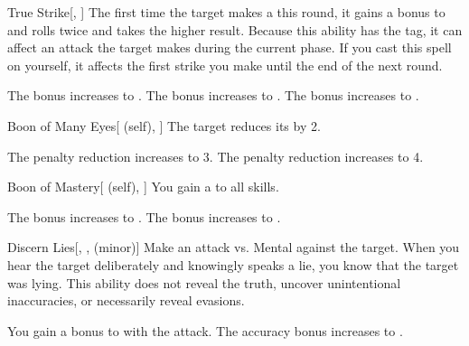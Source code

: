 \lowercase{\hypertarget{spell:True Strike}{}}\label{spell:True Strike}
\begin{freeability}[Rank 1]{\hypertarget{spell:True Strike}{True Strike}}[, ]
The first time the target makes a  this round,
it gains a  bonus to  and rolls twice and takes the higher result.
Because this ability has the  tag, it can affect an attack the target makes during the current phase.
If you cast this spell on yourself, it affects the first strike you make until the end of the next round.

\rankline
{} The bonus increases to .
 The bonus increases to .
 The bonus increases to .
\end{freeability}
\vspace{0.25em}



\lowercase{\hypertarget{spell:Boon of Many Eyes}{}}\label{spell:Boon of Many Eyes}
\begin{attuneability}[Rank 3]{\hypertarget{spell:Boon of Many Eyes}{Boon of Many Eyes}}[ (self), ]
The target reduces its  by 2.

\rankline
{} The penalty reduction increases to 3.
 The penalty reduction increases to 4.
\end{attuneability}
\vspace{0.25em}



\lowercase{\hypertarget{spell:Boon of Mastery}{}}\label{spell:Boon of Mastery}
\begin{attuneability}[Rank 3]{\hypertarget{spell:Boon of Mastery}{Boon of Mastery}}[ (self), ]
You gain a   to all skills.

\rankline
{} The bonus increases to .
 The bonus increases to .
\end{attuneability}
\vspace{0.25em}



\lowercase{\hypertarget{spell:Discern Lies}{}}\label{spell:Discern Lies}
\begin{freeability}[Rank 3]{\hypertarget{spell:Discern Lies}{Discern Lies}}[, ,  (minor)]
Make an attack vs. Mental against the target.
\hit When you hear the target deliberately and knowingly speaks a lie, you know that the target was lying.
This ability does not reveal the truth, uncover unintentional inaccuracies, or necessarily reveal evasions.

\rankline
{} You gain a  bonus to  with the attack.
 The accuracy bonus increases to .
\end{freeability}
\vspace{0.25em}




